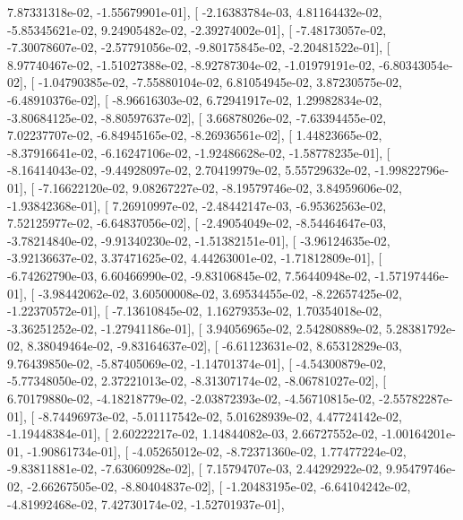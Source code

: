 \documentclass{article}
\begin{document}
          7.87331318e-02,  -1.55679901e-01],
       [ -2.16383784e-03,   4.81164432e-02,  -5.85345621e-02,
          9.24905482e-02,  -2.39274002e-01],
       [ -7.48173057e-02,  -7.30078607e-02,  -2.57791056e-02,
         -9.80175845e-02,  -2.20481522e-01],
       [  8.97740467e-02,  -1.51027388e-02,  -8.92787304e-02,
         -1.01979191e-02,  -6.80343054e-02],
       [ -1.04790385e-02,  -7.55880104e-02,   6.81054945e-02,
          3.87230575e-02,  -6.48910376e-02],
       [ -8.96616303e-02,   6.72941917e-02,   1.29982834e-02,
         -3.80684125e-02,  -8.80597637e-02],
       [  3.66878026e-02,  -7.63394455e-02,   7.02237707e-02,
         -6.84945165e-02,  -8.26936561e-02],
       [  1.44823665e-02,  -8.37916641e-02,  -6.16247106e-02,
         -1.92486628e-02,  -1.58778235e-01],
       [ -8.16414043e-02,  -9.44928097e-02,   2.70419979e-02,
          5.55729632e-02,  -1.99822796e-01],
       [ -7.16622120e-02,   9.08267227e-02,  -8.19579746e-02,
          3.84959606e-02,  -1.93842368e-01],
       [  7.26910997e-02,  -2.48442147e-03,  -6.95362563e-02,
          7.52125977e-02,  -6.64837056e-02],
       [ -2.49054049e-02,  -8.54464647e-03,  -3.78214840e-02,
         -9.91340230e-02,  -1.51382151e-01],
       [ -3.96124635e-02,  -3.92136637e-02,   3.37471625e-02,
          4.44263001e-02,  -1.71812809e-01],
       [ -6.74262790e-03,   6.60466990e-02,  -9.83106845e-02,
          7.56440948e-02,  -1.57197446e-01],
       [ -3.98442062e-02,   3.60500008e-02,   3.69534455e-02,
         -8.22657425e-02,  -1.22370572e-01],
       [ -7.13610845e-02,   1.16279353e-02,   1.70354018e-02,
         -3.36251252e-02,  -1.27941186e-01],
       [  3.94056965e-02,   2.54280889e-02,   5.28381792e-02,
          8.38049464e-02,  -9.83164637e-02],
       [ -6.61123631e-02,   8.65312829e-03,   9.76439850e-02,
         -5.87405069e-02,  -1.14701374e-01],
       [ -4.54300879e-02,  -5.77348050e-02,   2.37221013e-02,
         -8.31307174e-02,  -8.06781027e-02],
       [  6.70179880e-02,  -4.18218779e-02,  -2.03872393e-02,
         -4.56710815e-02,  -2.55782287e-01],
       [ -8.74496973e-02,  -5.01117542e-02,   5.01628939e-02,
          4.47724142e-02,  -1.19448384e-01],
       [  2.60222217e-02,   1.14844082e-03,   2.66727552e-02,
         -1.00164201e-01,  -1.90861734e-01],
       [ -4.05265012e-02,  -8.72371360e-02,   1.77477224e-02,
         -9.83811881e-02,  -7.63060928e-02],
       [  7.15794707e-03,   2.44292922e-02,   9.95479746e-02,
         -2.66267505e-02,  -8.80404837e-02],
       [ -1.20483195e-02,  -6.64104242e-02,  -4.81992468e-02,
          7.42730174e-02,  -1.52701937e-01],
\end{document}
